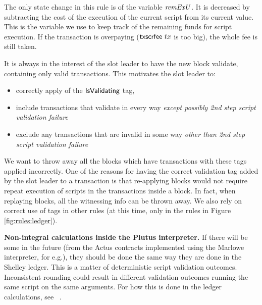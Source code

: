 The only state change in this rule is of the variable $\mathit{remExU}$.
It is decreased by subtracting the cost of the execution of the
current script from its current value.
This is the variable we use to keep track of the remaining funds for
script execution. If the transaction is overpaying ($\mathsf{txscrfee}~{tx}$
is too big), the whole fee is still taken.

It is always in the interest of the slot leader to have the new block validate,
containing only valid transactions. This motivates the
slot leader to:

\begin{itemize}
  \item correctly apply of the $\mathsf{IsValidating}$ tag,
  \item include transactions that validate in every way
  \textit{except possibly 2nd step script validation failure}
  \item exclude any transactions that are invalid
in some way \textit{other than 2nd step script validation failure}
\end{itemize}

We want to
throw away all the blocks which have transactions with these tags
applied incorrectly.
One of the reasons for having the correct validation tag added by the slot leader
to a transaction is that re-applying blocks would not require repeat
execution of scripts in the transactions inside a block. In fact, when replaying
blocks, all the witnessing info can be thrown away.
We also rely on correct use of tags in other rules (at this time, only in
the rules in Figure \ref{fig:rules:ledger}).


\textbf{Non-integral calculations inside the Plutus interpreter.} If there
will be some in the future (from the Actus contracts implemented using
the Marlowe interpreter, for e.g.), they should
be done the same way they are done in the Shelley ledger. This is a matter of
deterministic script validation outcomes. Inconsistent rounding could
result in different validation outcomes running the same script on the same
arguments. For how this is done in the ledger calculations, see
~\cite{non_int}.


